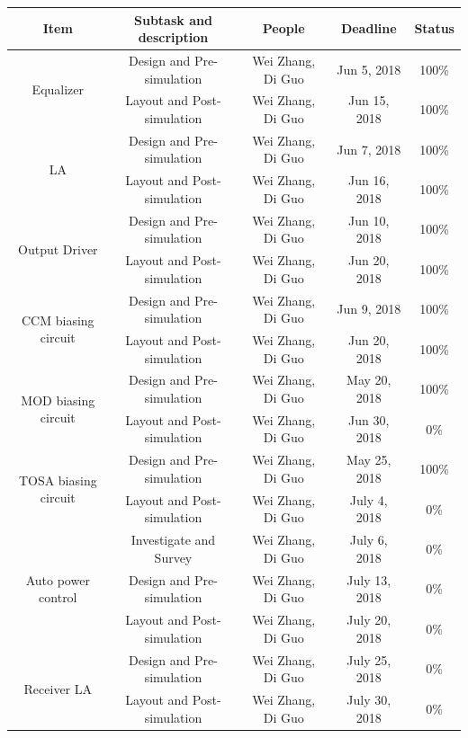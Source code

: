 \documentclass[11pt,a4paper]{article}
\begin{document}
\begin{spacing}{1.25}
\begin{table}[H]
\begin{tabular}{|c|c|c|c|c|}
\hline
\multicolumn{1}{|c|}{\textbf{Item}} & \multicolumn{1}{c|}{\textbf{Subtask and description}} & \multicolumn{1}{c|}{\textbf{People}} & \multicolumn{1}{c|}{\textbf{Deadline}} & \multicolumn{1}{c|}{\textbf{Status}}\\
\hline
\multirow{2}{*}{Equalizer} & Design and Pre-simulation & Wei Zhang, Di Guo & Jun 5, 2018 & 100\% \\ \cline{2-5}
& Layout and Post-simulation & Wei Zhang, Di Guo & Jun 15, 2018 & 100\% \\
\hline
\multirow{2}{*}{LA} & Design and Pre-simulation & Wei Zhang, Di Guo & Jun 7, 2018 & 100\% \\ \cline{2-5}
& Layout and Post-simulation & Wei Zhang, Di Guo & Jun 16, 2018 & 100\% \\
\hline
\multirow{2}{*}{Output Driver} & Design and Pre-simulation & Wei Zhang, Di Guo & Jun 10, 2018 & 100\% \\ \cline{2-5}
& Layout and Post-simulation & Wei Zhang, Di Guo & Jun 20, 2018 & 100\% \\
\hline
\multirow{2}{*}{CCM biasing circuit} & Design and Pre-simulation & Wei Zhang, Di Guo & Jun 9, 2018 & 100\% \\ \cline{2-5}
& Layout and Post-simulation & Wei Zhang, Di Guo & Jun 20, 2018 & 100\% \\
\hline
\multirow{2}{*}{MOD biasing circuit} & Design and Pre-simulation & Wei Zhang, Di Guo & May 20, 2018 & 100\% \\ \cline{2-5}
& Layout and Post-simulation & Wei Zhang, Di Guo & Jun 30, 2018 & 0\% \\
\hline
\multirow{2}{*}{TOSA biasing circuit} & Design and Pre-simulation & Wei Zhang, Di Guo & May 25, 2018 & 100\% \\ \cline{2-5}
& Layout and Post-simulation & Wei Zhang, Di Guo & July 4, 2018 & 0\% \\
\hline
\multirow{3}{*}{Auto power control} & Investigate and Survey & Wei Zhang, Di Guo & July 6, 2018 & 0\% \\ \cline{2-5}
& Design and Pre-simulation & Wei Zhang, Di Guo & July 13, 2018 & 0\% \\ \cline{2-5}
& Layout and Post-simulation & Wei Zhang, Di Guo & July 20, 2018 & 0\% \\
\hline
\multirow{2}{*}{Receiver LA} & Design and Pre-simulation & Wei Zhang, Di Guo & July 25, 2018 & 0\% \\ \cline{2-5}
& Layout and Post-simulation & Wei Zhang, Di Guo & July 30, 2018 & 0\% \\

\end{tabular}
\end{table}
\end{spacing}
\end{document}

